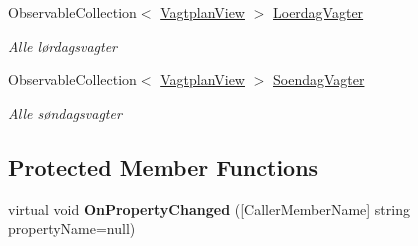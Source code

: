 \begin{DoxyCompactItemize}
Observable\+Collection$<$ \hyperlink{class__1aarsproeve_1_1_model_1_1_vagtplan_view}{Vagtplan\+View} $>$ \hyperlink{class__1aarsproeve_1_1_view_model_1_1_vagtplan_view_model_a8610e77bb66663a939068e98f2714df0}{Loerdag\+Vagter}
\begin{DoxyCompactList}\small\item\em Alle lørdagsvagter \end{DoxyCompactList}\item 
Observable\+Collection$<$ \hyperlink{class__1aarsproeve_1_1_model_1_1_vagtplan_view}{Vagtplan\+View} $>$ \hyperlink{class__1aarsproeve_1_1_view_model_1_1_vagtplan_view_model_aa31e5b366c76da7a1a64ef568af2764c}{Soendag\+Vagter}
\begin{DoxyCompactList}\small\item\em Alle søndagsvagter \end{DoxyCompactList}\end{DoxyCompactItemize}
\subsection*{Protected Member Functions}
\begin{DoxyCompactItemize}
\item 
\hypertarget{class__1aarsproeve_1_1_view_model_1_1_vagtplan_view_model_aa8227bf3edebc8faf6c6d4b622348f46}{}virtual void {\bfseries On\+Property\+Changed} (\mbox{[}Caller\+Member\+Name\mbox{]} string property\+Name=null)\label{class__1aarsproeve_1_1_view_model_1_1_vagtplan_view_model_aa8227bf3edebc8faf6c6d4b622348f46}

\end{DoxyCompactItemize}
